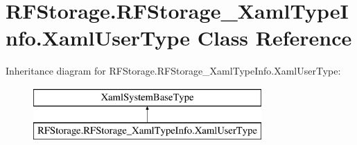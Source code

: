 \section{R\+F\+Storage.\+R\+F\+Storage\+\_\+\+Xaml\+Type\+Info.\+Xaml\+User\+Type Class Reference}
\label{class_r_f_storage_1_1_r_f_storage___xaml_type_info_1_1_xaml_user_type}
Inheritance diagram for R\+F\+Storage.\+R\+F\+Storage\+\_\+\+Xaml\+Type\+Info.\+Xaml\+User\+Type\+:\begin{figure}[H]
\begin{center}
\leavevmode
\includegraphics[height=2.000000cm]{class_r_f_storage_1_1_r_f_storage___xaml_type_info_1_1_xaml_user_type}
\end{center}
\end{figure}
